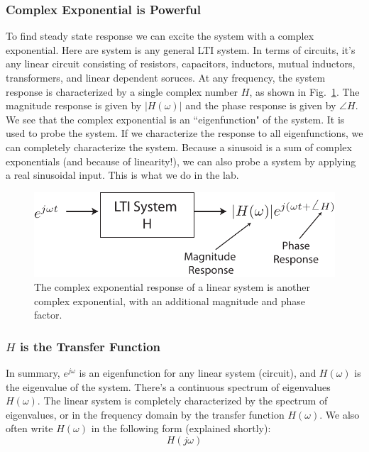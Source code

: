 \subsubsection{Complex Exponential is Powerful}
To find steady state response we can excite the system with a complex exponential.   Here are system is any general LTI system. In terms of circuits, it's any linear circuit consisting of resistors, capacitors, inductors, mutual inductors, transformers, and linear dependent soruces.  At any frequency, the system response is characterized by a single complex number $H$, as shown in Fig.~\ref{fig:lti_resp}.   The magnitude response is given by $|H(\omega)|$ and
the phase response is given by $\angle H$.   We see that the complex exponential is an ``eigenfunction" of the system.  It is used to probe the system.  If we characterize the response to all eigenfunctions, we can completely characterize the system.   Because a sinusoid is a sum of complex exponentials (and because of linearity!), we can also probe a system by applying a real sinusoidal input.  This is what we do in the lab.
\begin{figure}[tb]
\centering
\includegraphics[width=.65\columnwidth]{lti_resp}
\caption{The complex exponential response of a linear system is another complex exponential, with an additional magnitude and phase factor. }
\label{fig:lti_resp}
\end{figure}
\subsubsection{$H$ is the Transfer Function}
In summary, $e^{j\omega}$ is an eigenfunction for any linear system (circuit), and $H(\omega)$ is the eigenvalue of the system.  There's a continuous spectrum of eigenvalues $H(\omega)$.   The linear system is completely characterized by the spectrum of eigenvalues, or in the frequency domain by the transfer function $H(\omega)$.  We also often write $H(\omega)$ in the following form (explained shortly):
    \begin{equation}
        H(j\omega)
    \end{equation}
